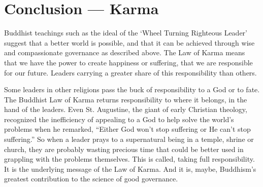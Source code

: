 \documentclass[11pt, openany]{book}
\begin{document}
\chapter*{Conclusion — Karma}

Buddhist teachings such as the ideal of the ‘Wheel Turning Righteous Leader’ suggest that a better world is possible, and that it can be achieved through wise and compassionate governance as described above. The Law of Karma means that we have the power to create happiness or suffering, that we are responsible for our future. Leaders carrying a greater share of this responsibility than others.

Some leaders in other religions pass the buck of responsibility to a God or to fate. The Buddhist Law of Karma returns responsibility to where it belongs, in the hand of the leaders. Even St. Augustine, the giant of early Christian theology, recognized the inefficiency of appealing to a God to help solve the world’s problems when he remarked, “Either God won’t stop suffering or He can’t stop suffering.” So when a leader prays to a supernatural being in a temple, shrine or church, they are probably wasting precious time that could be better used in grappling with the problems themselves. This is called, taking full responsibility. It is the underlying message of the Law of Karma. And it is, maybe, Buddhism’s greatest contribution to the science of good governance.


\newpage
\end{document}
